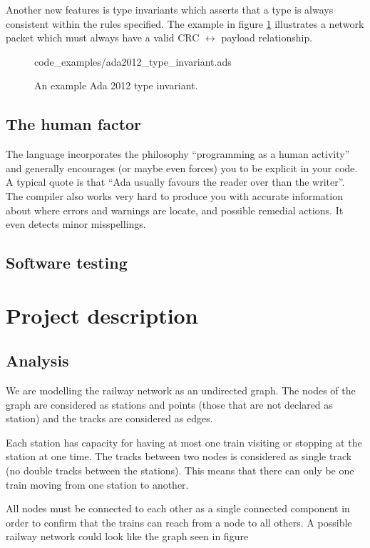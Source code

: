 \documentclass[10pt,a4paper]{article}
\begin{document}
Another new features is type invariants which asserts that a type is always consistent within the rules specified. The example in figure \ref{fig:ada2012_type_invariant} illustrates a network packet which must always have a valid CRC $\leftrightarrow$ payload relationship.

\begin{figure}[h]
\centering
 {code_examples/ada2012_type_invariant.ads}
 \caption{An example Ada 2012 type invariant.}
 \label{fig:ada2012_type_invariant}
\end{figure}
\subsection{The human factor}
The language incorporates the philosophy ``programming as a human activity'' and generally encourages (or maybe even forces) you to be explicit in your code. A typical quote is that ``Ada usually favours the reader over than the writer''.
The compiler also works very hard to produce you with accurate information about where errors and warnings are locate, and possible remedial actions. It even detects minor misspellings.

\subsection{Software testing}

\section{Project description}

\subsection{Analysis}
We are modelling the railway network as an undirected graph. The nodes of the graph are considered as stations and points (those that are not declared as station) and the tracks are considered as edges.
 
Each station has capacity for having at most one train visiting or stopping at the station at one time.
The tracks between two nodes is considered as single track (no double tracks between the stations). This means that there can only be one train moving from one station to another.  
 
All nodes must be connected to each other as a single connected component in order to confirm that the trains can reach from a node to all others.  A possible railway network could look like the graph seen in figure 
\end{document}
